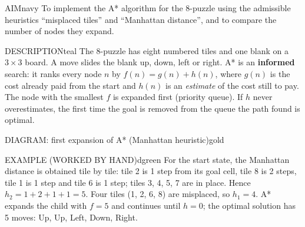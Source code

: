 \documentclass[11pt,a4paper]{article}
\newenvironment{aim}{\begin{secbox}{AIM}{navy}}{\end{secbox}}
\newenvironment{descr}{\begin{secbox}{DESCRIPTION}{teal}}{\end{secbox}}
\newenvironment{example}{\begin{secbox}{EXAMPLE (WORKED BY HAND)}{dgreen}}{\end{secbox}}
\newenvironment{diagram}[1]{\begin{secbox}{DIAGRAM: #1}{gold}\centering}{\end{secbox}}
\newcommand{\puzzle}[4]{%
  \begin{scope}[shift={(#1,#2)}]
  \foreach \v [count=\i from 0] in {#3} {
    \pgfmathtruncatemacro{\r}{\i/3}
    \pgfmathtruncatemacro{\c}{\i-3*\r}
    \ifnum\v=0
      \draw[draw=navy,fill=slate!18,line width=0.6pt] (\c*0.62,-\r*0.62) rectangle ++(0.62,-0.62);
    \else
      \draw[draw=navy,fill=#4,line width=0.6pt] (\c*0.62,-\r*0.62) rectangle ++(0.62,-0.62);
      \node[font=\sffamily\bfseries\small] at (\c*0.62+0.31,-\r*0.62-0.31) {\v};
    \fi}
  \end{scope}}
\begin{document}
\begin{aim}
To implement the A* algorithm for the 8-puzzle using the admissible heuristics ``misplaced tiles'' and ``Manhattan distance'', and to compare the number of nodes they expand.
\end{aim}

\begin{descr}
The 8-puzzle has eight numbered tiles and one blank on a $3\times 3$ board. A move slides the blank up, down, left or right. A* is an \textbf{informed} search: it ranks every node $n$ by
$f(n)=g(n)+h(n)$, where $g(n)$ is the cost already paid from the start and $h(n)$ is an \emph{estimate} of the cost still to pay. The node with the smallest $f$ is expanded first (priority queue). If $h$ never overestimates, the first time the goal is removed from the queue the path found is optimal.
\end{descr}

\begin{diagram}{first expansion of A* (Manhattan heuristic)}
\end{diagram}

\begin{example}
For the start state, the Manhattan distance is obtained tile by tile: tile 2 is 1 step from its goal cell, tile 8 is 2 steps, tile 1 is 1 step and tile 6 is 1 step; tiles 3, 4, 5, 7 are in place. Hence $h_2 = 1+2+1+1 = 5$. Four tiles (1, 2, 6, 8) are misplaced, so $h_1 = 4$. A* expands the child with $f=5$ and continues until $h=0$; the optimal solution has 5 moves: Up, Up, Left, Down, Right.
\end{example}
\end{document}
